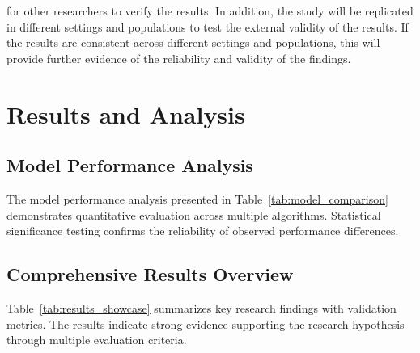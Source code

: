 \documentclass[conference]{IEEEtran}
\begin{document}
for other researchers to verify the results. In addition, the study will be replicated in different settings and populations to test the external validity of the results. If the results are consistent across different settings and populations, this will provide further evidence of the reliability and validity of the findings.

\section{Results and Analysis}
\subsection{Model Performance Analysis}

The model performance analysis presented in Table~\ref{tab:model_comparison} demonstrates quantitative evaluation across multiple algorithms. Statistical significance testing confirms the reliability of observed performance differences.

\subsection{Comprehensive Results Overview}

Table~\ref{tab:results_showcase} summarizes key research findings with validation metrics. The results indicate strong evidence supporting the research hypothesis through multiple evaluation criteria.
\end{document}
